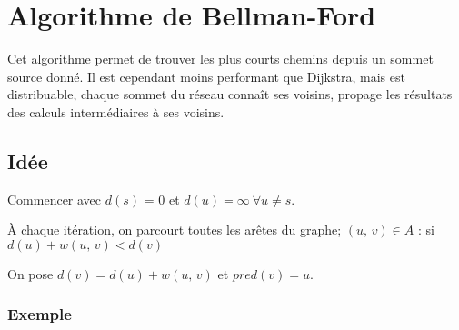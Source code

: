 \chapter{Algorithme de Bellman-Ford}
\vspace*{-0.5cm}
Cet algorithme permet de trouver les plus courts chemins depuis un sommet source donné. Il est cependant moins performant que Dijkstra, mais est distribuable, chaque sommet du réseau connaît ses voisins, propage les résultats des calculs intermédiaires à ses voisins.

\section{Idée}

Commencer avec $d(s)$ = 0 et $d(u) = \infty \ \forall u \neq s$.

À chaque itération, on parcourt toutes les arêtes du graphe; $(u,\, v)\in A$ : si $d(u) + w(u,\, v) < d(v)$

On pose $d(v) = d(u) + w(u,\, v)$ et $pred(v) = u$.

\subsection*{Exemple}

\begin{figure}[h]
  \centering
\end{figure}%


